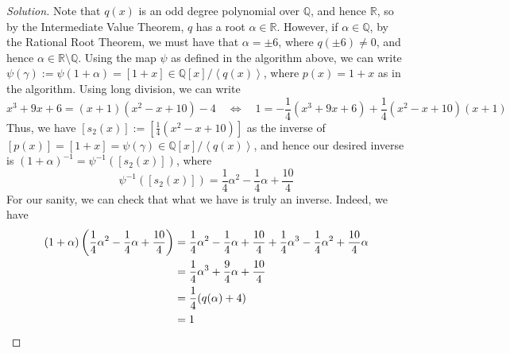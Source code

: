 \documentclass[11pt]{article}
\def\mbb{\mathbb}
\def\R{\mbb{R}}
\def\Q{\mbb{Q}}
\newcommand{\Ang}[1]{\left\langle #1 \right\rangle}
\theoremstyle{pink}
\newtheorem{definition}{Definition}
\theoremstyle{boxedsolution}
\theoremstyle{definition}
\newtheorem{proposition}[definition]{Proposition}
\theoremstyle{claim}
\begin{document}
\begin{proof}[Solution]
Note that $q(x)$ is an odd degree polynomial over $\Q$, and hence $\R$, so by the Intermediate Value Theorem, $q$ has a root $\alpha \in \R$. However, if $\alpha \in \Q$, by the Rational Root Theorem, we must have that $\alpha = \pm 6$, where $q(\pm 6) \neq 0$, and hence $\alpha \in \R \setminus \Q$.
Using the map $\psi$ as defined in the algorithm above, we can write $\psi(\gamma):=\psi(1 + \alpha) = [1+x] \in \Q[x]/ \Ang{q(x)}$, where $p(x) = 1+x$ as in the algorithm. Using long division, we can write 
\[
x^3+9x+6 = (x+1)(x^2-x+10) - 4 \quad \iff \quad 1 = -\frac{1}{4}(x^3+9x+6) + \frac{1}{4}(x^2-x+10)(x+1)
\]
Thus, we have $[s_2(x)] := \left[\frac{1}{4}(x^2-x+10)\right]$ as the inverse of $[p(x)] = [1+x] = \psi(\gamma) \in \Q[x]/\Ang{q(x)}$, and hence our desired inverse is $(1+\alpha)^{-1}=\psi^{-1}([s_2(x)])$, where 
\[
\psi^{-1}([s_2(x)]) = \frac{1}{4}\alpha^2 - \frac{1}{4}\alpha + \frac{10}{4}
\]
For our sanity, we can check that what we have is truly an inverse. Indeed, we have
\begin{align*}
    (1 + \alpha)\left( \frac{1}{4}\alpha^2 - \frac{1}{4}\alpha + \frac{10}{4}\right) &= \frac{1}{4}\alpha^2 - \frac{1}{4}\alpha + \frac{10}{4} + \frac{1}{4}\alpha^3 - \frac{1}{4}\alpha^2 + \frac{10}{4}\alpha 
    \\&= \frac{1}{4}\alpha^3 + \frac{9}{4}\alpha + \frac{10}{4}
    \\&= \frac{1}{4}(q(\alpha) + 4)
    \\&= 1 \qedhere
\end{align*}
\end{proof}




\end{document}
